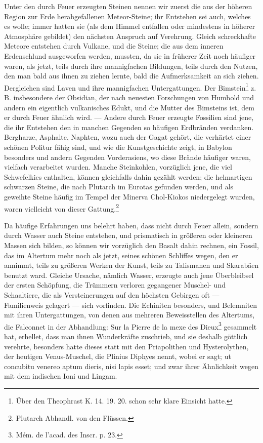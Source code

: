 \documentclass[a4paper, 11pt, oneside, polutonikogreek, german]{article}
\begin{document}
Unter den durch Feuer erzeugten Steinen nennen wir zuerst die aus der höheren Region zur Erde herabgefallenen Meteor-Steine; ihr Entstehen sei auch, welches es wolle; immer hatten sie (als dem Himmel entfallen oder mindestens in höherer Atmosphäre gebildet) den nächsten Anspruch auf Verehrung. Gleich schreckhafte Meteore entstehen durch Vulkane, und die Steine; die aus dem inneren Erdenschlund ausgeworfen werden, mussten, da sie in früherer Zeit noch häufiger waren, als jetzt, teils durch ihre mannigfachen Bildungen, teils durch den Nutzen, den man bald aus ihnen zu ziehen lernte, bald die Aufmerksamkeit an sich ziehen. Dergleichen sind Laven und ihre mannigfachen Untergattungen. Der Bimstein\footnote{Über den Theophrast K. 14. 19. 20. schon sehr klare Einsicht hatte.} z. B. insbesondere der Obsidian, der nach neuesten Forschungen von Humbold und andern ein eigentlich vulkanisches Edukt, und die Mutter des Bimsteins ist, dem er durch Feuer ähnlich wird. --- Andere durch Feuer erzeugte Fossilien sind jene, die ihr Entstehen den in manchen Gegenden so häufigen Erdbränden verdanken. Bergharze, Asphalte, Naphten, wozu auch der Gagat gehört, die verhärtet einer schönen Politur fähig sind, und wie die Kunstgeschichte zeigt, in Babylon besonders und andern Gegenden Vorderasiens, wo diese Brände häufiger waren, vielfach verarbeitet wurden. Manche Steinkohlen, vorzüglich jene, die viel Schwefelkies enthalten, können gleichfalls dahin gezählt werden; die helmartigen schwarzen Steine, die nach Plutarch im Eurotas gefunden werden, und als geweihte Steine häufig im Tempel der Minerva Chol-Kiokos niedergelegt wurden, waren vielleicht von dieser Gattung.\footnote{Plutarch Abhandl. von den Flüssen.}

Da häufige Erfahrungen uns belehrt haben, dass nicht durch Feuer allein, sondern durch Wasser auch Steine entstehen, und prismatisch in größeren oder kleineren Massen sich bilden, so können wir vorzüglich den Basalt dahin rechnen, ein Fossil, das im Altertum mehr noch als jetzt, seines schönen Schliffes wegen, den er annimmt, teils zu größeren Werken der Kunst, teils zu Talismanen und Skarabäen benutzt ward. Gleiche Ursache, nämlich Wasser, erzeugte auch jene Überbleibsel der ersten Schöpfung, die Trümmern verloren gegangener Muschel- und Schaaltiere, die als Versteinerungen auf den höchsten Gebirgen oft --- Familienweis gelagert --- sich vorfinden. Die Echiniten besonders, und Belemniten mit ihren Untergattungen, von denen aus mehreren Beweisstellen des Altertums, die Falconnet in der Abhandlung: Sur la Pierre de la mexe des Dieux\footnote{Mém. de l'acad. des Inscr. p. 23.} gesammelt hat, erhellet, dass man ihnen Wunderkräfte zuschrieb, und sie deshalb göttlich verehrte, besonders hatte dieses statt mit den Priapolithen und Hysterolythen, der heutigen Venus-Muschel, die Plinius Diphyes nennt, wobei er sagt; ut concubitu venereo aptum dieris, nisi lapis esset; und zwar ihrer Ähnlichkeit wegen mit dem indischen Ioni und Lingam.
\end{document}
